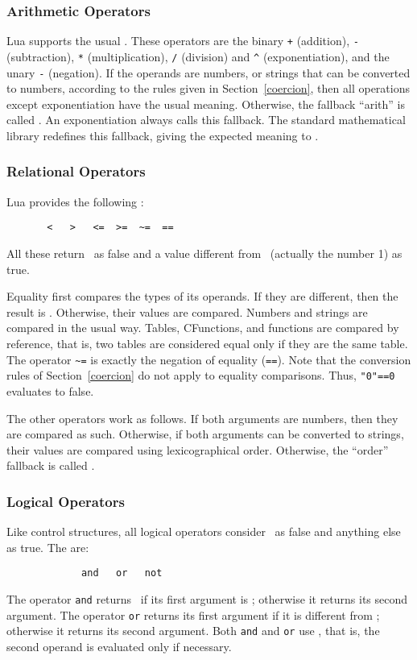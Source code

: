 \subsubsection{Arithmetic Operators}
Lua supports the usual .
These operators are the binary
\verb'+' (addition),
\verb'-' (subtraction),
\verb'*' (multiplication),
\verb'/' (division) and \verb'^' (exponentiation),
and the unary \verb'-' (negation).
If the operands are numbers, or strings that can be converted to
numbers, according to the rules given in Section~\ref{coercion},
then all operations except exponentiation have the usual meaning.
Otherwise, the fallback ``arith'' is called .
An exponentiation always calls this fallback.
The standard mathematical library redefines this fallback,
giving the expected meaning to 
.

\subsubsection{Relational Operators}
Lua provides the following :
\begin{verbatim}
       <   >   <=  >=  ~=  ==
\end{verbatim}
All these return \nil\ as false and a value different from \nil\
(actually the number 1) as true.

Equality first compares the types of its operands.
If they are different, then the result is \nil.
Otherwise, their values are compared.
Numbers and strings are compared in the usual way.
Tables, CFunctions, and functions are compared by reference,
that is, two tables are considered equal only if they are the same table.
The operator \verb'~=' is exactly the negation of equality (\verb'==').
Note that the conversion rules of Section~\ref{coercion}
do not apply to equality comparisons.
Thus, \verb|"0"==0| evaluates to false.

The other operators work as follows.
If both arguments are numbers, then they are compared as such.
Otherwise, if both arguments can be converted to strings,
their values are compared using lexicographical order.
Otherwise, the ``order'' fallback is called .

\subsubsection{Logical Operators}
Like control structures, all logical operators
consider \nil\ as false and anything else as true.
The  are:
\begin{verbatim}
             and   or   not
\end{verbatim}
The operator \verb'and' returns \nil\ if its first argument is \nil;
otherwise it returns its second argument.
The operator \verb'or' returns its first argument
if it is different from \nil;
otherwise it returns its second argument.
Both \verb'and' and \verb'or' use ,
that is,
the second operand is evaluated only if necessary.

